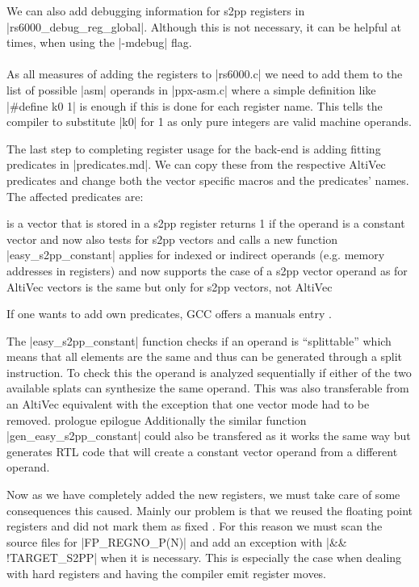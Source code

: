 We can also add debugging information for s2pp registers in |rs6000_debug_reg_global|.
Although this is not necessary, it can be helpful at times, when using the |-mdebug| flag.
\\
\\
As all measures of adding the registers to |rs6000.c| we need to add them to the list of possible |asm| operands in 
|ppx-asm.c| where a simple definition like |#define k0 1| is enough if this is done for each register name.
This tells the compiler to substitute |k0| for 1 as only pure integers are valid machine operands.

The last step to completing register usage for the back-end is adding fitting predicates in |predicates.md|.
We can copy these from the respective AltiVec predicates and change both the vector specific macros and the predicates' names.
The affected predicates are:
\begin{description}
         is a vector that is stored in a s2pp register
         returns 1 if the operand is a constant vector and now also tests for s2pp vectors and calls a new function |easy_s2pp_constant|
         applies for indexed or indirect operands (e.g. memory addresses in registers) and now supports the case of a s2pp vector operand as for AltiVec vectors
         is the same but only for s2pp vectors, not AltiVec
\end{description}
If one wants to add own predicates, GCC offers a manuals entry \cite{GCCint:predicates}.

The |easy_s2pp_constant| function checks if an operand is ``splittable'' which means that all elements are the same and thus can be generated through a split instruction.
To check this the operand is analyzed sequentially if either of the two available splats can synthesize the same operand.
This was also transferable from an AltiVec equivalent with the exception that one vector mode had to be removed.
prologue epilogue
Additionally the similar function |gen_easy_s2pp_constant| could also be transfered as it works the same way but generates RTL code that will create a constant vector operand from a different operand.

Now as we have completely added the new registers, we must take care of some consequences this caused.
Mainly our problem is that we reused the floating point registers and did not mark them as fixed .
For this reason we must scan the source files for |FP_REGNO_P(N)| and add an exception with |&& !TARGET_S2PP| when it is necessary.
This is especially the case when dealing with hard registers and having the compiler emit register moves.


